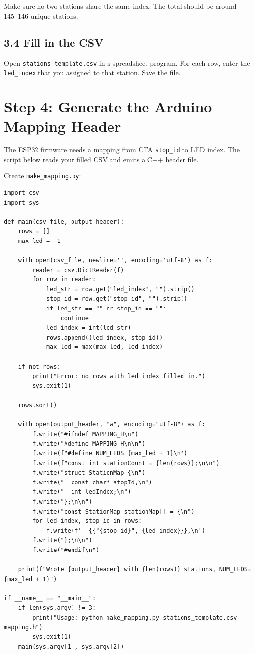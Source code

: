 \documentclass[11pt]{article}
\begin{document}
Make sure no two stations share the same index. The total should be around 145--146 unique stations.

\subsection{3.4 Fill in the CSV}

Open \texttt{stations\_template.csv} in a spreadsheet program. For each row, enter the \texttt{led\_index} that you assigned to that station. Save the file.

\section{Step 4: Generate the Arduino Mapping Header}

The ESP32 firmware needs a mapping from CTA \texttt{stop\_id} to LED index. The script below reads your filled CSV and emits a C++ header file.

Create \texttt{make\_mapping.py}:

\begin{lstlisting}[style=python,caption={Python script to generate mapping.h from the filled CSV.},label={lst:make_mapping}]
import csv
import sys

def main(csv_file, output_header):
    rows = []
    max_led = -1

    with open(csv_file, newline='', encoding='utf-8') as f:
        reader = csv.DictReader(f)
        for row in reader:
            led_str = row.get("led_index", "").strip()
            stop_id = row.get("stop_id", "").strip()
            if led_str == "" or stop_id == "":
                continue
            led_index = int(led_str)
            rows.append((led_index, stop_id))
            max_led = max(max_led, led_index)

    if not rows:
        print("Error: no rows with led_index filled in.")
        sys.exit(1)

    rows.sort()

    with open(output_header, "w", encoding="utf-8") as f:
        f.write("#ifndef MAPPING_H\n")
        f.write("#define MAPPING_H\n\n")
        f.write(f"#define NUM_LEDS {max_led + 1}\n")
        f.write(f"const int stationCount = {len(rows)};\n\n")
        f.write("struct StationMap {\n")
        f.write("  const char* stopId;\n")
        f.write("  int ledIndex;\n")
        f.write("};\n\n")
        f.write("const StationMap stationMap[] = {\n")
        for led_index, stop_id in rows:
            f.write(f'  {{"{stop_id}", {led_index}}},\n')
        f.write("};\n\n")
        f.write("#endif\n")

    print(f"Wrote {output_header} with {len(rows)} stations, NUM_LEDS={max_led + 1}")

if __name__ == "__main__":
    if len(sys.argv) != 3:
        print("Usage: python make_mapping.py stations_template.csv mapping.h")
        sys.exit(1)
    main(sys.argv[1], sys.argv[2])
\end{lstlisting}
\end{document}
